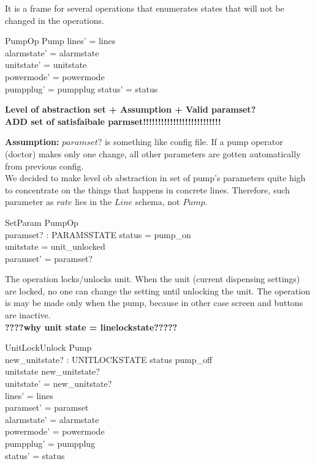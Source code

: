 \documentclass{article}
\begin{document}
	It is a frame for several operations that enumerates states that will not be changed in the operations.
	\begin{schema}{PumpOp}
		\Delta Pump
	\where
    	lines' = lines  \\
    	alarmstate' = alarmstate \\
    	unitstate' = unitstate \\
    	powermode' = powermode \\
    	pumpplug' = pumpplug
    	status' = status \\
    \end{schema}
	

	\textbf{Level of abstraction set + Assumption + Valid paramset?\\
	ADD set of satisfaibale parmset!!!!!!!!!!!!!!!!!!!!!!!!!!}
	
	\textbf{Assumption:}  $paramset?$ is something like config file. If a pump operator (doctor) makes only one change, all other parameters are gotten automatically from previous config.\\
	We decided to make level ob abstraction in set of pump's parameters quite high to concentrate on the things that happens in concrete lines. Therefore, such parameter as $rate$ lies in the $Line$ schema, not $Pump$.
	\begin{schema}{SetParam}
		PumpOp \\
		paramset? : PARAMSSTATE 
	\where
		status = pump\_on \\ 
		unitstate = unit\_unlocked \\
		paramset' = paramset?
	\end{schema}

	
		The operation locks/unlocks unit. When the unit (current dispensing settings) are locked, no one can change the setting until unlocking the unit. The operation is may be made only when the pump, because in other case screen and buttons are inactive.\\
		\textbf{????why unit state = linelockstate?????}
    \begin{schema}{UnitLockUnlock}
		\Delta Pump \\
		new\_unitstate? : UNITLOCKSTATE
	\where
		status \neq pump\_off \\ 
		unitstate \neq new\_unitstate? \\
		unitstate' = new\_unitstate? \\
    	lines' = lines  \\
    	paramset' = paramset\\
    	alarmstate' = alarmstate \\
    	powermode' = powermode \\
    	pumpplug' = pumpplug \\
    	status' = status \\	
	\end{schema}
\end{document}
